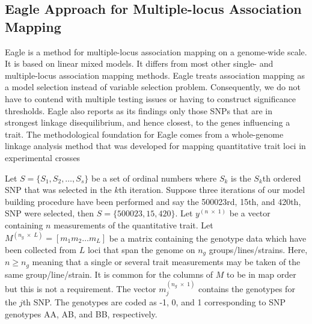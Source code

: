 \documentclass{article}
\begin{document}
\subsection{Eagle Approach for Multiple-locus Association Mapping}

Eagle is a method for multiple-locus association mapping on a genome-wide scale. It is based on linear mixed models. It differs from most other single- and multiple-locus association mapping methods. Eagle treats association mapping as a model selection instead of variable selection problem. Consequently,  we do not have to contend with multiple testing issues or having to construct significance thresholds.  
Eagle also 
reports as its findings only those SNPs that are in strongest linkage disequilibrium, and hence closest, to the genes influencing a trait. 
The methodological foundation for Eagle comes from a whole-genome linkage analysis method that was developed for mapping 
quantitative trait loci in experimental crosses \cite{verbyla2007analysis} 


Let $S = \{ S_1, S_2, \ldots, S_s\}$ be a set of ordinal numbers where $S_k$ is the $S_k$th ordered SNP that was 
selected in the $k$th iteration. Suppose three iterations of our model building procedure 
have been performed and say the 500023rd, 15th, and 420th, 
SNP were selected, then $S=\{500023, 15, 420\}$. 
Let $y^{(n \; \times \;1)}$ be a vector containing $n$ measurements of the quantitative trait. 
Let $M^{(n_g \; \times \; L)} = [m_1 m_2 \ldots m_L]$ be a matrix containing the genotype data which have been collected 
from $L$ loci that span the genome on $n_g$ groups/lines/strains.  Here, $n \geq n_g$ meaning that a single or several trait measurements 
may be taken of the same group/line/strain. 
 It is common for the columns of $M$ to be in map order but this is not a requirement. 
The vector $m_j^{(n_g \; \times \; 1)}$ contains the genotypes for the $j$th SNP. 
The genotypes are coded as -1, 0, and 1 corresponding to SNP genotypes AA, AB, and BB, respectively. 
\end{document}

